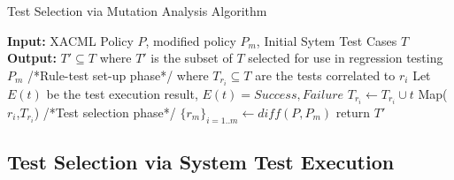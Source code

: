 \begin{algorithmic}
\begin{algorithm}[t]
\caption{Test Selection via Mutation Analysis Algorithm}
\STATE \textbf{Input:} XACML Policy $P$, modified policy $P_{m}$, Initial Sytem Test Cases $T$
\STATE \textbf{Output:} $T' \subseteq T$ where $T'$ is the subset of $T$ selected for use in regression testing $P_{m}$
\STATE /*Rule-test set-up phase*/
 where $T_{r_{i}} \subseteq T$ are the tests correlated to $r_{i}$ 
\STATE Let $E(t)$ be the test execution result, $E(t)={Success, Failure}$
\STATE $T_{r_{i}} \leftarrow T_{r_{i}} \cup t$
\ENDIF
\ENDFOR
\STATE Map($r_{i}$,$T_{r_{i}}$)
\ENDFOR
\STATE /*Test selection phase*/
\STATE $\{r_{m}\}_{i=1..m} \leftarrow diff(P,P_{m})$
\ENDFOR
\STATE return $T'$
\end{algorithm}
\end{algorithmic}

\subsection{Test Selection via System Test Execution}

